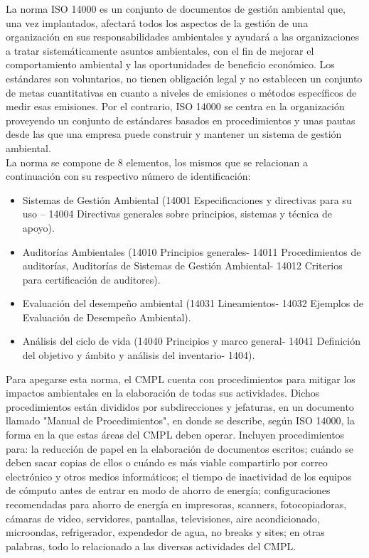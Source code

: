 	La norma ISO 14000 es un conjunto de documentos de gestión ambiental que, una vez implantados, afectará todos los aspectos de la gestión de una organización en sus responsabilidades ambientales y ayudará a las organizaciones a tratar sistemáticamente asuntos ambientales, con el fin de mejorar el comportamiento ambiental y las oportunidades de beneficio económico. Los estándares son voluntarios, no tienen obligación legal y no establecen un conjunto de metas cuantitativas en cuanto a niveles de emisiones o métodos específicos de medir esas emisiones. Por el contrario, ISO 14000 se centra en la organización proveyendo un conjunto de estándares basados en procedimientos y unas pautas desde las que una empresa puede construir y mantener un sistema de gestión ambiental. \cite{ISO14000}\\
	
	La norma se compone de 8 elementos, los mismos que se relacionan a continuación con su respectivo número de identificación:\\
	
	\begin{itemize}
		\item Sistemas de Gestión Ambiental (14001 Especificaciones y directivas para su uso – 14004 Directivas generales sobre principios, sistemas y técnica de apoyo).
		\item Auditorías Ambientales (14010 Principios generales- 14011 Procedimientos de auditorías, Auditorías de Sistemas de Gestión Ambiental- 14012 Criterios para certificación de auditores).
		\item Evaluación del desempeño ambiental (14031 Lineamientos- 14032 Ejemplos de Evaluación de Desempeño Ambiental).
		\item Análisis del ciclo de vida (14040 Principios y marco general- 14041 Definición del objetivo y ámbito y análisis del inventario- 1404).
	\end{itemize}

	Para apegarse esta norma, el CMPL cuenta con procedimientos para mitigar los impactos ambientales en la elaboración de todas sus actividades. Dichos procedimientos están divididos por subdirecciones y jefaturas, en un documento llamado "Manual de Procedimientos", en donde se describe, según ISO 14000, la forma en la que estas áreas del CMPL deben operar. Incluyen procedimientos para: la reducción de papel en la elaboración de documentos escritos; cuándo se deben sacar copias de ellos o cuándo es más viable compartirlo por correo electrónico y otros medios informáticos; el tiempo de inactividad de los equipos de cómputo antes de entrar en modo de ahorro de energía; configuraciones recomendadas para ahorro de energía en impresoras, scanners, fotocopiadoras, cámaras de video, servidores, pantallas, televisiones, aire acondicionado, microondas, refrigerador, expendedor de agua, no breaks y sites; en otras palabras, todo lo relacionado a las diversas actividades del CMPL.\\
	
